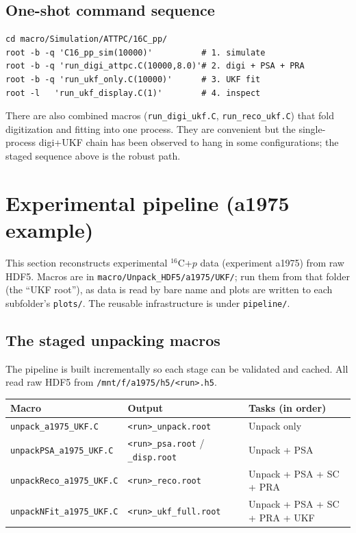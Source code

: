 \documentclass[11pt,a4paper]{article}
\newcommand{\file}[1]{\texttt{\small #1}}
\begin{document}
\subsection{One-shot command sequence}

\begin{lstlisting}[style=bash]
cd macro/Simulation/ATTPC/16C_pp/
root -b -q 'C16_pp_sim(10000)'          # 1. simulate
root -b -q 'run_digi_attpc.C(10000,8.0)'# 2. digi + PSA + PRA
root -b -q 'run_ukf_only.C(10000)'      # 3. UKF fit
root -l   'run_ukf_display.C(1)'        # 4. inspect
\end{lstlisting}

\begin{notebox}
There are also combined macros (\file{run\_digi\_ukf.C}, \file{run\_reco\_ukf.C})
that fold digitization and fitting into one process. They are convenient but the
single-process digi+UKF chain has been observed to hang in some configurations;
the staged sequence above is the robust path.
\end{notebox}

\section{Experimental pipeline (a1975 example)}\label{sec:exp}

This section reconstructs experimental $^{16}$C+$p$ data (experiment a1975) from
raw HDF5. Macros are in \file{macro/Unpack\_HDF5/a1975/UKF/}; run them from that
folder (the ``UKF root''), as data is read by bare name and plots are written to
each subfolder's \file{plots/}. The reusable infrastructure is under
\file{pipeline/}.

\subsection{The staged unpacking macros}

The pipeline is built incrementally so each stage can be validated and cached. All
read raw HDF5 from \file{/mnt/f/a1975/h5/<run>.h5}.

\begin{longtable}{@{}p{4.4cm} p{3.7cm} p{7.0cm}@{}}
\toprule
\textbf{Macro} & \textbf{Output} & \textbf{Tasks (in order)} \\
\midrule
\endhead
\file{unpack\_a1975\_UKF.C}    & \file{<run>\_unpack.root} & Unpack only \\
\file{unpackPSA\_a1975\_UKF.C} & \file{<run>\_psa.root} / \file{\_disp.root} & Unpack + PSA \\
\file{unpackReco\_a1975\_UKF.C}& \file{<run>\_reco.root}   & Unpack + PSA + SC + PRA \\
\file{unpackNFit\_a1975\_UKF.C}& \file{<run>\_ukf\_full.root}& Unpack + PSA + SC + PRA + UKF \\
\bottomrule
\end{longtable}
\end{document}
